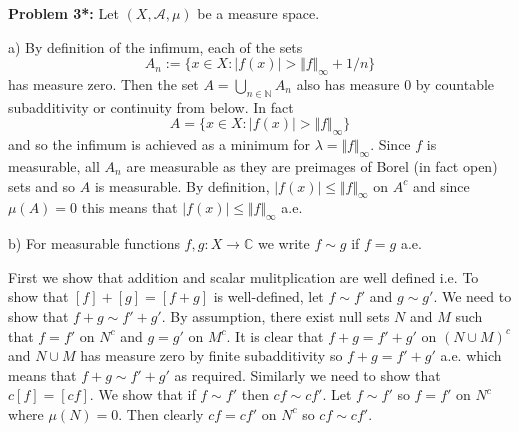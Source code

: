 \documentclass[12pt]{amsart} %
\def\N{\mathbb{N}}
\def\C{\mathbb{C}}
\def\ra{\rightarrow}
\def\:{\colon}
\begin{document}
  
\bigskip
\noindent
\textbf{Problem 3*:} Let $(X, \mathcal{A},\mu)$ be a measure space.

\smallskip
a) By definition of the infimum, each of the sets $$A_n := \{x \in  X: |f(x)| > \Vert f \Vert_{\infty} + 1/n\}$$ has measure zero. Then the set $A = \bigcup_{n \in \N} A_n$ also has measure 0 by countable subadditivity or continuity from below. In fact $$A = 
\{x \in  X: |f(x)| > \Vert f \Vert_{\infty}\}$$ and so the infimum is achieved as a minimum for $\lambda = \Vert f \Vert_\infty$. Since $f$ is measurable, all  $A_n$ are measurable as they are preimages of Borel (in fact open) sets and so $A$ is measurable. By definition,  $|f(x)| \le \Vert f \Vert_\infty$ on $A^c$ and since  $\mu(A) = 0$ this means that $|f(x)| \le \Vert f \Vert_\infty$ a.e.

\smallskip
b) For measurable functions $f,g\: X \ra \C$ we write $f\sim g$ if $f=g$ a.e.

First we show that addition and scalar mulitplication are well defined i.e. To show that $[f] + [g] = [f+g]$ is well-defined, let $f \sim f'$ and  $g \sim g'$. We need to show that  $f+g \sim f' + g'$. By assumption, there exist null sets $N$ and  $M$ such that  $f=f'$ on $N^c$ and $g = g'$ on $M^c$. It is clear that $f+g = f' + g'$ on $\left( N \cup M \right)^c$ and $N \cup M$ has measure zero by finite subadditivity so $f + g = f' + g'$ a.e. which means that $f+g \sim f' + g'$ as required. Similarly we need to show that $c[f]= [cf]$. We show that if $f \sim f'$ then  $cf \sim cf'$. Let  $f \sim f'$ so  $f = f'$ on $N^c$ where  $\mu(N) = 0$. Then clearly $cf = cf'$ on  $N^c$ so  $cf \sim cf'$.
\end{document}
